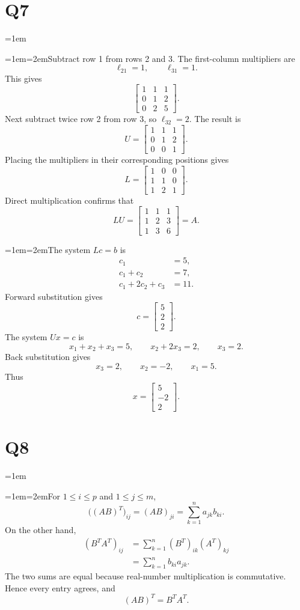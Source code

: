 \documentclass[11pt]{article}
\newcommand{\solutionquestion}[1]{\par\leftskip=0pt\section*{Q#1}\leftskip=1em}
\newcommand{\solutionpart}[1]{\par\smallskip\leftskip=1em\noindent\hangindent=2em\hangafter=1\makebox[1.5em][l]{\textbf{(#1)}}\hspace{0.5em}\ignorespaces}
\begin{document}
\solutionquestion{7}
\solutionpart{i}Subtract row 1 from rows 2 and 3. The first-column multipliers are
\[
\ell_{21}=1,\qquad \ell_{31}=1.
\]
This gives
\[
\begin{bmatrix}
1&1&1\\
0&1&2\\
0&2&5
\end{bmatrix}.
\]
Next subtract twice row 2 from row 3, so $\ell_{32}=2$. The result is
\[
U=\begin{bmatrix}
1&1&1\\
0&1&2\\
0&0&1
\end{bmatrix}.
\]
Placing the multipliers in their corresponding positions gives
\[
L=\begin{bmatrix}
1&0&0\\
1&1&0\\
1&2&1
\end{bmatrix}.
\]
Direct multiplication confirms that
\[
LU=
\begin{bmatrix}
1&1&1\\
1&2&3\\
1&3&6
\end{bmatrix}=A.
\]

\solutionpart{ii}The system $Lc=b$ is
\[
\begin{aligned}
c_1&=5,\\
c_1+c_2&=7,\\
c_1+2c_2+c_3&=11.
\end{aligned}
\]
Forward substitution gives
\[
c=\begin{bmatrix}5\\2\\2\end{bmatrix}.
\]
The system $Ux=c$ is
\[
x_1+x_2+x_3=5,\qquad x_2+2x_3=2,\qquad x_3=2.
\]
Back substitution gives
\[
x_3=2,\qquad x_2=-2,\qquad x_1=5.
\]
Thus
\[
x=\begin{bmatrix}5\\-2\\2\end{bmatrix}.
\]

\solutionquestion{8}
\solutionpart{i}For $1\leq i\leq p$ and $1\leq j\leq m$,
\[
{\bigl({(AB)}^{T}\bigr)}_{ij}={(AB)}_{ji}
=\sum_{k=1}^{n}a_{jk}b_{ki}.
\]
On the other hand,
\[
\begin{aligned}
{(B^{T}A^{T})}_{ij}
&=\sum_{k=1}^{n}{(B^{T})}_{ik}{(A^{T})}_{kj}\\
&=\sum_{k=1}^{n}b_{ki}a_{jk}.
\end{aligned}
\]
The two sums are equal because real-number multiplication is commutative. Hence every entry agrees, and
\[
{(AB)}^{T}=B^{T}A^{T}.
\]
\end{document}
